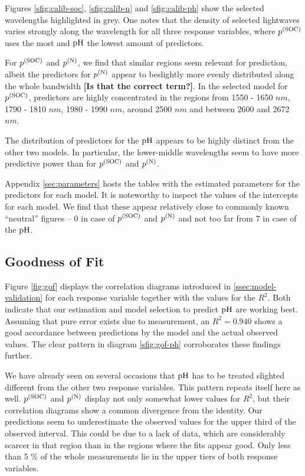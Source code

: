 		Figures \ref{sfig:calib-soc}, \ref{sfig:calib-n} and \ref{sfig:calib-ph} show the selected wavelengths highlighted in grey.
		One notes that the density of selected lightwaves varies strongly along the wavelength for all three response variables, where $p^{(\mathrm{SOC})}$ uses the most and $\mathrm{pH}$ the lowest amount of predictors.
		
		For $p^{(\mathrm{SOC})}$ and $p^{(\mathrm{N})}$, we find that similar regions seem relevant for prediction, albeit the predictors for $p^{(\mathrm{N})}$ appear to beslightly more evenly distributed along the whole bandwidth \textbf{[Is that the correct term?]}.
		In the selected model for $p^{(\mathrm{SOC})}$, predictors are highly concentrated in the regions from 1550 - 1650 $\unit{nm}$, 1790 - 1810 $\unit{nm}$, 1980 - 1990 $\unit{nm}$, around 2500 $\unit{nm}$ and between 2600 and 2672 $\unit{nm}$.
		
		The distribution of predictors for the $\mathrm{pH}$ appears to be highly distinct from the other two models.
		In particular, the lower-middle wavelengths seem to have more predictive power than for $p^{(\mathrm{SOC})}$ and $p^{(\mathrm{N})}$.
		
		Appendix \ref{sec:parameters} hosts the tables with the estimated parameters for the predictors for each model.
		It is noteworthy to inspect the values of the intercepts for each model.
		We find that these appear relatively close to commonly known \enquote{neutral} figures -- 0 in case of $p^{\mathrm{(SOC)}}$ and $p^{\mathrm{(N)}}$ and not too far from 7 in case of the $\mathrm{pH}$. %
		

	\subsection{Goodness of Fit}
	\label{ssec:suitability}
	
		Figure \ref{fig:gof} displays the correlation diagrams introduced in \ref{ssec:model-validation} for each response variable together with the values for the $R^2$.
		Both indicate that our estimation and model selection to predict $\mathrm{pH}$ are working best.
		Assuming that pure error exists due to measurement, an $R^2 = 0.940$ shows a good accordance between predictions by the model and the actual observed values.
		The clear pattern in diagram \ref{sfig:gof-ph} corroborates these findings further.
		
		We have already seen on several occasions that $\mathrm{pH}$ has to be treated slighted different from the other two response variables.
		This pattern repeats itself here as well.
		$p^{\mathrm{(SOC)}}$ and $p^{\mathrm{(N)}}$ display not only somewhat lower values for $R^2$, but their correlation diagrams show a common divergence from the identity.
		Our predictions seem to underestimate the observed values for the upper third of the observed interval.
		This could be due to a lack of data, which are considerably scarcer in that region than in the regions where the fits appear good.
		Only less than 5 \% of the whole measurements lie in the upper tiers of both response variables.
		
